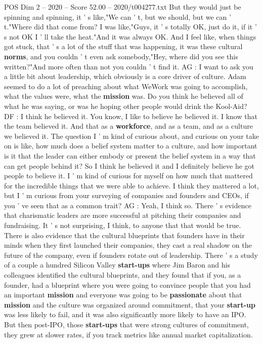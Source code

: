 \begin{textsample}{POS Dim 2 – 2020 – Score 52.00 – 2020/t004277.txt}
But they would just be spinning and spinning, it ' s like,"We can ' t, but we should, but we can ' t."Where did that come from?
I was like,"Guys, it ' s totally OK, just do it, if it ' s not OK I ' ll take the heat."And it was always OK.
And I feel like, when things got stuck, that ' s a lot of the stuff that was happening, it was these cultural \textbf{norms}, and you couldn ' t even ask somebody,"Hey, where did you see this written?"And more often than not you couldn ' t find it.
AG : I want to ask you a little bit about leadership, which obviously is a core driver of culture.
Adam seemed to do a lot of preaching about what WeWork was going to accomplish, what the values were, what the \textbf{mission} was.
Do you think he believed all of what he was saying, or was he hoping other people would drink the Kool-Aid?
DF : I think he believed it.
You know, I like to believe he believed it.
I know that the team believed it.
And that as a \textbf{workforce}, and as a team, and as a culture we believed it.
The question I ' m kind of curious about, and curious on your take on is like, how much does a belief system matter to a culture, and how important is it that the leader can either embody or present the belief system in a way that can get people behind it?
So I think he believed it and I definitely believe he got people to believe it.
I ' m kind of curious for myself on how much that mattered for the incredible things that we were able to achieve.
I think they mattered a lot, but I ' m curious from your surveying of companies and founders and CEOs, if you ' ve seen that as a common trait?
AG : Yeah, I think so.
There ' s evidence that charismatic leaders are more successful at pitching their companies and fundraising.
It ' s not surprising, I think, to anyone that that would be true.
There is also evidence that the cultural blueprints that founders have in their minds when they first launched their companies, they cast a real shadow on the future of the company, even if founders rotate out of leadership.
There ' s a study of a couple a hundred Silicon Valley \textbf{start-ups} where Jim Baron and his colleagues identified the cultural blueprints, and they found that if you, as a founder, had a blueprint where you were going to convince people that you had an important \textbf{mission} and everyone was going to be \textbf{passionate} about that \textbf{mission} and the culture was organized around commitment, that your \textbf{start-up} was less likely to fail, and it was also significantly more likely to have an IPO.
But then post-IPO, those \textbf{start-ups} that were strong cultures of commitment, they grew at slower rates, if you track metrics like annual market capitalization.

\end{textsample}
